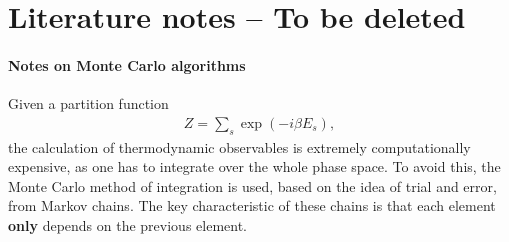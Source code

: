 \section{Literature notes -- To be deleted}

\paragraph{Notes on Monte Carlo algorithms}
Given a partition function 
\begin{align}
	Z = \sum_s \exp{(-i\beta E_s)},
\end{align}
the calculation of thermodynamic observables is extremely computationally expensive, as one has to integrate over the whole phase space.
To avoid this, the Monte Carlo method of integration is used, based on the idea of trial and error, from Markov chains. The key characteristic of these chains is that each element \textbf{only} depends on the previous element.

